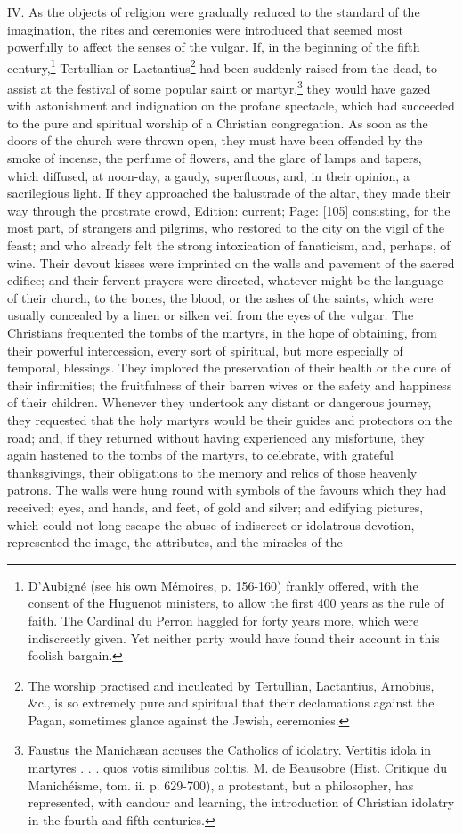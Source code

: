 IV. As the objects of religion were gradually reduced to the standard of the imagination, the rites and ceremonies were introduced that seemed most powerfully to affect the senses of the vulgar. If, in the beginning of the fifth century,\footnote{D\texthebrew{}’Aubigné (see his own Mémoires, p. 156-160) frankly offered, with the consent of the Huguenot ministers, to allow the first 400 years as the rule of faith. The Cardinal du Perron haggled for forty years more, which were indiscreetly given. Yet neither party would have found their account in this foolish bargain.} Tertullian or Lactantius\footnote{The worship practised and inculcated by Tertullian, Lactantius, Arnobius, \&c., is so extremely pure and spiritual that their declamations against the Pagan, sometimes glance against the Jewish, ceremonies.} had been suddenly raised from the dead, to assist at the festival of some popular saint or martyr,\footnote{Faustus the Manichæan accuses the Catholics of idolatry. Vertitis idola in martyres . . . quos votis similibus colitis. M. de Beausobre (Hist. Critique du Manichéisme, tom. ii. p. 629-700), a protestant, but a philosopher, has represented, with candour and learning, the introduction of Christian idolatry in the fourth and fifth centuries.} they would have gazed with astonishment and indignation on the profane spectacle, which had succeeded to the pure and spiritual worship of a Christian congregation. As soon as the doors of the church were thrown open, they must have been offended by the smoke of incense, the perfume of flowers, and the glare of lamps and tapers, which diffused, at noon-day, a gaudy, superfluous, and, in their opinion, a sacrilegious light. If they approached the balustrade of the altar, they made their way through the prostrate crowd, Edition: current; Page: [105] consisting, for the most part, of strangers and pilgrims, who restored to the city on the vigil of the feast; and who already felt the strong intoxication of fanaticism, and, perhaps, of wine. Their devout kisses were imprinted on the walls and pavement of the sacred edifice; and their fervent prayers were directed, whatever might be the language of their church, to the bones, the blood, or the ashes of the saints, which were usually concealed by a linen or silken veil from the eyes of the vulgar. The Christians frequented the tombs of the martyrs, in the hope of obtaining, from their powerful intercession, every sort of spiritual, but more especially of temporal, blessings. They implored the preservation of their health or the cure of their infirmities; the fruitfulness of their barren wives or the safety and happiness of their children. Whenever they undertook any distant or dangerous journey, they requested that the holy martyrs would be their guides and protectors on the road; and, if they returned without having experienced any misfortune, they again hastened to the tombs of the martyrs, to celebrate, with grateful thanksgivings, their obligations to the memory and relics of those heavenly patrons. The walls were hung round with symbols of the favours which they had received; eyes, and hands, and feet, of gold and silver; and edifying pictures, which could not long escape the abuse of indiscreet or idolatrous devotion, represented the image, the attributes, and the miracles of the 